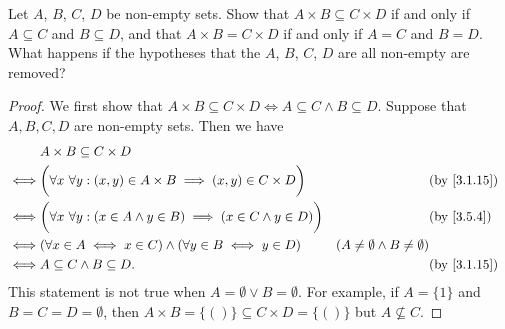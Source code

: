 \begin{ex}\label{ex:3.5.6}
  Let \(A\), \(B\), \(C\), \(D\) be non-empty sets.
  Show that \(A \times B \subseteq C \times D\) if and only if \(A \subseteq C\) and \(B \subseteq D\), and that \(A \times B = C \times D\) if and only if \(A = C\) and \(B = D\).
  What happens if the hypotheses that the \(A\), \(B\), \(C\), \(D\) are all non-empty are removed?
\end{ex}

\begin{proof}
  We first show that \(A \times B \subseteq C \times D \iff A \subseteq C \land B \subseteq D\).
  Suppose that \(A, B, C, D\) are non-empty sets.
  Then we have
  \begin{align*}
         & A \times B \subseteq C \times D                                                                                                                                     \\
    \iff & \bigg(\forall x \ \forall y : (x, y) \in A \times B \implies (x, y) \in C \times D\bigg)    &                                           & \text{(by \cref{3.1.15})} \\
    \iff & \bigg(\forall x \ \forall y :(x \in A \land y \in B) \implies (x \in C \land y \in D)\bigg) &                                           & \by{3.5.4}                \\
    \iff & (\forall x \in A \iff x \in C) \land (\forall y \in B \iff y \in D)                         & (A \neq \emptyset \land B \neq \emptyset)                             \\
    \iff & A \subseteq C \land B \subseteq D.                                                          &                                           & \text{(by \cref{3.1.15})}
  \end{align*}
  This statement is not true when \(A = \emptyset \lor B = \emptyset\).
  For example, if \(A = \{1\}\) and \(B = C = D = \emptyset\), then \(A \times B = \{()\} \subseteq C \times D = \{()\}\) but \(A \not \subseteq C\).


\end{proof}
